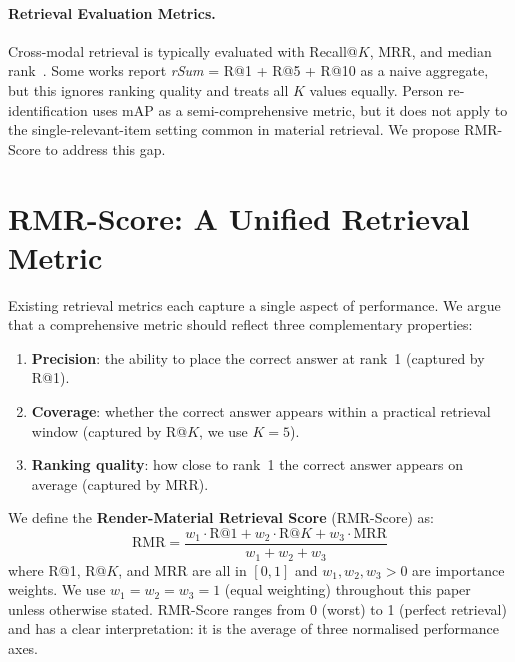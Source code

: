 \documentclass[10pt,twocolumn]{article}
\begin{document}
\paragraph{Retrieval Evaluation Metrics.}
Cross-modal retrieval is typically evaluated with Recall@$K$, MRR, and median
rank~\cite{radford2021clip}.
Some works report \emph{rSum} = R@1 + R@5 + R@10 as a naive aggregate, but
this ignores ranking quality and treats all $K$ values equally.
Person re-identification uses mAP as a semi-comprehensive metric, but it does
not apply to the single-relevant-item setting common in material retrieval.
We propose RMR-Score to address this gap.

\section{RMR-Score: A Unified Retrieval Metric}
\label{sec:rmr}

Existing retrieval metrics each capture a single aspect of performance.
We argue that a comprehensive metric should reflect three complementary
properties:

\begin{enumerate}[leftmargin=*,itemsep=0pt]
  \item \textbf{Precision}: the ability to place the correct answer at rank~1
        (captured by R@1).
  \item \textbf{Coverage}: whether the correct answer appears within a
        practical retrieval window (captured by R@$K$, we use $K{=}5$).
  \item \textbf{Ranking quality}: how close to rank~1 the correct answer
        appears on average (captured by MRR).
\end{enumerate}

We define the \textbf{Render-Material Retrieval Score} (RMR-Score) as:
\begin{equation}
  \text{RMR} = \frac{w_1 \cdot \text{R@1} + w_2 \cdot \text{R@}K + w_3 \cdot \text{MRR}}{w_1 + w_2 + w_3}
  \label{eq:rmr}
\end{equation}
where R@1, R@$K$, and MRR are all in $[0,1]$ and $w_1, w_2, w_3 > 0$ are
importance weights.
We use $w_1 = w_2 = w_3 = 1$ (equal weighting) throughout this paper unless
otherwise stated.
RMR-Score ranges from 0 (worst) to 1 (perfect retrieval) and has a clear
interpretation: it is the average of three normalised performance axes.
\end{document}
